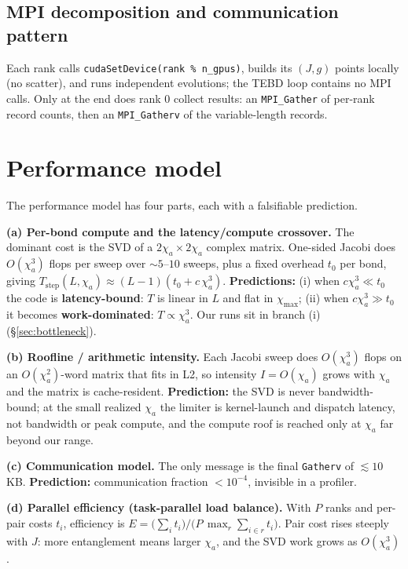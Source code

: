 \documentclass[11pt]{article}
\newcommand{\code}[1]{\texttt{#1}}
\begin{document}
\subsection{MPI decomposition and communication pattern}

Each rank calls \code{cudaSetDevice(rank \% n\_gpus)}, builds its $(J,g)$ points locally (no scatter), and runs independent evolutions; the TEBD loop contains no MPI calls. Only at the end does rank 0 collect results: an \code{MPI\_Gather} of per-rank record counts, then an \code{MPI\_Gatherv} of the variable-length records.

\section{Performance model}

The performance model has four parts, each with a falsifiable prediction.

\textbf{(a) Per-bond compute and the latency/compute crossover.} The dominant cost is the SVD of a $2\chi_a\times2\chi_a$ complex matrix. One-sided Jacobi does $O(\chi_a^3)$ flops per sweep over $\sim5$--$10$ sweeps, plus a fixed overhead $t_0$ per bond, giving $T_\text{step}(L,\chi_a)\approx(L-1)(t_0 + c\,\chi_a^3)$. \textbf{Predictions:} (i) when $c\chi_a^3\ll t_0$ the code is \textbf{latency-bound}: $T$ is linear in $L$ and flat in $\chi_{\max}$; (ii) when $c\chi_a^3\gg t_0$ it becomes \textbf{work-dominated}: $T\propto\chi_a^3$. Our runs sit in branch (i) (\S\ref{sec:bottleneck}).

\textbf{(b) Roofline / arithmetic intensity.} Each Jacobi sweep does $O(\chi_a^3)$ flops on an $O(\chi_a^2)$-word matrix that fits in L2, so intensity $I=O(\chi_a)$ grows with $\chi_a$ and the matrix is cache-resident. \textbf{Prediction:} the SVD is never bandwidth-bound; at the small realized $\chi_a$ the limiter is kernel-launch and dispatch latency, not bandwidth or peak compute, and the compute roof is reached only at $\chi_a$ far beyond our range.

\textbf{(c) Communication model.} The only message is the final \code{Gatherv} of $\lesssim10$ KB.
\textbf{Prediction:} communication fraction $<10^{-4}$, invisible in a profiler.

\textbf{(d) Parallel efficiency (task-parallel load balance).} With $P$ ranks and per-pair costs $t_i$, efficiency is $E=\bigl(\sum_i t_i\bigr)/\bigl(P\,\max_r\sum_{i\in r}t_i\bigr)$. Pair cost rises steeply with $J$: more entanglement means larger $\chi_a$, and the SVD work grows as $O(\chi_a^3)$.
\end{document}
